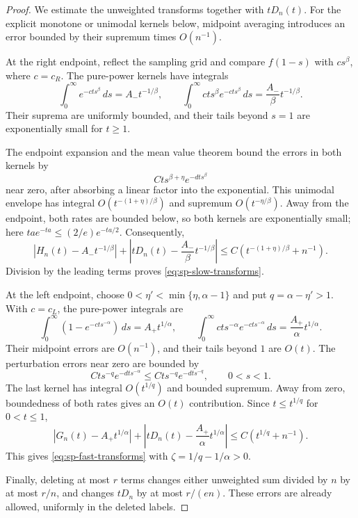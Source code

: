 \documentclass[11pt]{article}
\theoremstyle{remark}
\theoremstyle{plain}
\begin{document}
\begin{proof}
We estimate the unweighted transforms together with $tD_n(t)$.  For the
explicit monotone or unimodal kernels below, midpoint averaging introduces
an error bounded by their supremum times $O(n^{-1})$.

At the right endpoint, reflect the sampling grid and compare $f(1-s)$
with $cs^\beta$, where $c=c_R$.  The pure-power kernels have integrals
\[
 \int_0^\infty e^{-ct s^\beta}\,ds=A_-t^{-1/\beta},\qquad
 \int_0^\infty ct s^\beta e^{-ct s^\beta}\,ds
 =\frac{A_-}{\beta}t^{-1/\beta}.
\]
Their suprema are uniformly bounded, and their tails beyond $s=1$ are
exponentially small for $t\ge1$.

The endpoint expansion and the mean value theorem bound the errors in
both kernels by
\[
 Ct s^{\beta+\eta}e^{-dt s^\beta}
\]
near zero, after absorbing a linear factor into the exponential.  This
unimodal envelope has integral $O(t^{-(1+\eta)/\beta})$ and supremum
$O(t^{-\eta/\beta})$.  Away from the endpoint, both rates are bounded
below, so both kernels are exponentially small; here
$tae^{-ta}\le(2/e)e^{-ta/2}$.  Consequently,
\[
 |H_n(t)-A_-t^{-1/\beta}|
 +\left|tD_n(t)-\frac{A_-}{\beta}t^{-1/\beta}\right|
 \le C\left(t^{-(1+\eta)/\beta}+n^{-1}\right).
\]
Division by the leading terms proves \eqref{eq:sp-slow-transforms}.

At the left endpoint, choose $0<\eta'<\min\{\eta,\alpha-1\}$ and put
$q=\alpha-\eta'>1$.  With $c=c_L$, the pure-power integrals are
\[
 \int_0^\infty(1-e^{-ct s^{-\alpha}})\,ds=A_+t^{1/\alpha},\qquad
 \int_0^\infty ct s^{-\alpha}e^{-ct s^{-\alpha}}\,ds
 =\frac{A_+}{\alpha}t^{1/\alpha}.
\]
Their midpoint errors are $O(n^{-1})$, and their tails beyond $1$ are
$O(t)$.  The perturbation errors near zero are bounded by
\[
 Ct s^{-q}e^{-dt s^{-\alpha}}
 \le Ct s^{-q}e^{-dt s^{-q}},\qquad 0<s<1.
\]
The last kernel has integral $O(t^{1/q})$ and bounded supremum.  Away
from zero, boundedness of both rates gives an $O(t)$ contribution.
Since $t\le t^{1/q}$ for $0<t\le1$,
\[
 |G_n(t)-A_+t^{1/\alpha}|
 +\left|tD_n(t)-\frac{A_+}{\alpha}t^{1/\alpha}\right|
 \le C(t^{1/q}+n^{-1}).
\]
This gives \eqref{eq:sp-fast-transforms} with
$\zeta=1/q-1/\alpha>0$.

Finally, deleting at most $r$ terms changes either unweighted sum divided
by $n$ by at most $r/n$, and changes $tD_n$ by at most $r/(en)$.
These errors are already allowed, uniformly in the deleted labels.
\end{proof}
\end{document}
